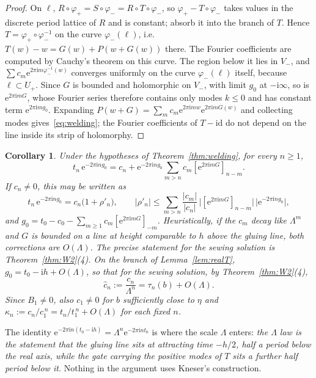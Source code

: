 \documentclass[11pt]{amsart}
\newtheorem{corollary}[theorem]{Corollary}
\theoremstyle{definition}
\newcommand{\Rr}{R}
\newcommand{\eee}{\mathrm{e}}
\newcommand{\ii}{\mathrm{i}}
\begin{document}
\begin{proof}
On $\ell$, $\Rr\circ\varphi_+=S\circ\varphi_-=\Rr\circ T\circ\varphi_-$, so
$\varphi_+-T\circ\varphi_-$ takes values in the discrete period lattice of
$\Rr$ and is constant; absorb it into the branch of $T$.  Hence
$T=\varphi_+\circ\varphi_-^{-1}$ on the curve $\varphi_-(\ell)$, i.e.\
$T(w)-w=G(w)+P(w+G(w))$ there.  The Fourier coefficients are computed by
Cauchy's theorem on this curve.  The region below it lies in $V_-$, and
$\sum c_m\eee^{2\pi\ii m\varphi_-^{-1}(w)}$ converges uniformly on the curve
$\varphi_-(\ell)$ itself, because $\ell\subset U_+$.  Since $G$ is bounded and holomorphic on $V_-$, with
limit $g_0$ at $-\ii\infty$, so is $\eee^{2\pi\ii mG}$, whose Fourier series
therefore contains only modes $k\le0$ and has constant term
$\eee^{2\pi\ii mg_0}$.  Expanding
$P(w+G)=\sum_mc_m\eee^{2\pi\ii mw}\eee^{2\pi\ii mG(w)}$ and collecting modes
gives~\eqref{eq:welding}; the Fourier coefficients of $T-\mathrm{id}$ do not depend
on the line inside its strip of holomorphy.
\end{proof}

\begin{corollary}\label{cor:cn}
Under the hypotheses of Theorem~\ref{thm:welding}, for every $n\ge1$,
\[
 t_n\,\eee^{-2\pi\ii ng_0}
 =c_n+\eee^{-2\pi\ii ng_0}
   \sum_{m>n}c_m[\eee^{2\pi\ii mG}]_{n-m}.
\]
If $c_n\ne0$, this may be written as
\[
 t_n\,\eee^{-2\pi\ii ng_0}=c_n\bigl(1+\rho'_n\bigr),\qquad
 |\rho'_n|\le\sum_{m>n}\frac{|c_m|}{|c_n|}\,
 \bigl|[\eee^{2\pi\ii mG}]_{n-m}\bigr|\,\bigl|\eee^{-2\pi\ii ng_0}\bigr|,
\]
and $g_0=t_0-c_0-\sum_{m\ge1}c_m[\eee^{2\pi\ii mG}]_{-m}$.  Heuristically, if the
$c_m$ decay like $\Lambda^m$ and $G$ is bounded on a line at height comparable to
$h$ above the gluing line, both corrections are $O(\Lambda)$.  The precise
statement for the sewing solution is Theorem~\ref{thm:W2}(4).  On the
branch of Lemma~\ref{lem:realT}, $g_0=t_0-\ii h+O(\Lambda)$, so that
for the sewing solution, by Theorem~\ref{thm:W2}(4),
\begin{equation}\label{eq:chat-tau}
 \hat c_n:=\frac{c_n}{\Lambda^n}=\tau_n(b)+O(\Lambda).
\end{equation}
Since $B_1\ne0$, also $c_1\ne0$ for $b$ sufficiently close to $\eta$ and
$\kappa_n:=c_n/c_1^{\,n}=t_n/t_1^{\,n}+O(\Lambda)$ for each fixed $n$.
\end{corollary}

The identity $\eee^{-2\pi\ii n(t_0-\ii h)}=\Lambda^n\eee^{-2\pi\ii nt_0}$
is where the scale $\Lambda$ enters: \emph{the $\Lambda$ law is the statement
that the gluing line sits at attracting time $-h/2$, half a period below the
real axis, while the gate carrying the positive modes of $T$ sits a further
half period below it.}  Nothing in the argument uses Kneser's construction.
\end{document}
